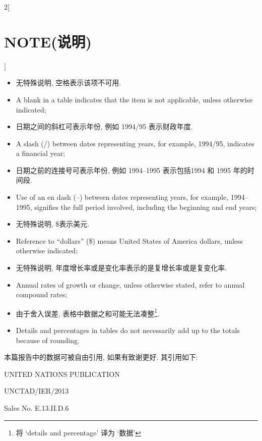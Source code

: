 \documentclass[a4paper, UTF8, 12pt]{article}
\begin{document}
\begin{paracol}{2}[\section{NOTE(说明)}]
\begin{itemize}
        \switchcolumn*
        \item 无特殊说明, 空格表示该项不可用.
        \switchcolumn
        \item A blank in a table indicates that the item is not applicable, unless otherwise indicated; 
        
        \switchcolumn*
        \item 日期之间的斜杠可表示年份, 例如 1994/95 表示财政年度.
        \switchcolumn
        \item A slash (/) between dates representing years, for example, 1994/95, indicates a financial year; 
        
        \switchcolumn*
        \item 日期之前的连接号可表示年份, 例如 1994--1995 表示包括1994 和 1995 年的时间段.
        \switchcolumn
        \item Use of an en dash (–) between dates representing years, for example, 1994–1995, signifies the full period involved, including the beginning and end years;
        
        \switchcolumn*
        \item 无特殊说明, \$表示美元.
        \switchcolumn
        \item Reference to “dollars” (\$) means United States of America dollars, unless otherwise indicated; 
        
        \switchcolumn*
        \item 无特殊说明, 年度增长率或是变化率表示的是复增长率或是复变化率.
        \switchcolumn
        \item Annual rates of growth or change, unless otherwise stated, refer to annual compound rates;
        
        \switchcolumn*
        \item 由于舍入误差, 表格中数据之和可能无法凑整\footnote{将 `details and percentage' 译为 `数据'}.
        \switchcolumn
        \item Details and percentages in tables do not necessarily add up to the totals because of rounding. 
    \end{itemize}

    \switchcolumn*
    本篇报告中的数据可被自由引用, 如果有致谢更好. 其引用如下:
    
    \begin{center}
        UNITED NATIONS PUBLICATION 

        UNCTAD/IER/2013 

        Sales No. E.13.II.D.6


\end{center}
\end{paracol}
\end{document}
